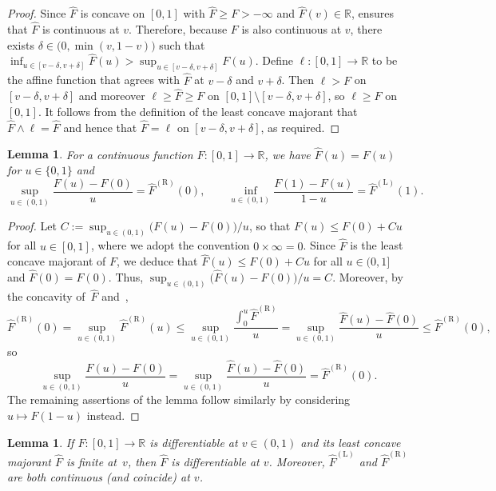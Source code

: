 \documentclass[a4paper]{article}
\newcommand{\R}{\mathbb{R}}
\newtheorem{lemma}[theorem]{Lemma}
\theoremstyle{definition}
\begin{document}
\begin{proof}
Since $\hat{F}$ is concave on $[0,1]$ with $\hat{F} \geq F > -\infty$ and $\hat{F}(v) \in \R$, \citet[Theorem~10.1]{rockafellar97convex} ensures that $\hat{F}$ is continuous at $v$. Therefore, because $F$ is also continuous at $v$, there exists $\delta \in \bigl(0,\min(v, 1 - v)\bigr)$ such that $\inf_{u \in [v - \delta, v + \delta]} \hat{F}(u) > \sup_{u \in [v - \delta, v + \delta]} F(u)$. Define $\ell \colon [0,1] \rightarrow \R$ to be the affine function that agrees with $\hat{F}$ at $v - \delta$ and $v + \delta$.  Then $\ell > F$ on $[v - \delta, v + \delta]$ and moreover $\ell \geq \hat{F} \geq F$ on $[0,1] \setminus [v - \delta, v + \delta]$, so $\ell \geq F$ on $[0,1]$. It follows from the definition of the least concave majorant that $\hat{F} \wedge \ell = \hat{F}$ and hence that $\hat{F} = \ell$ on $[v - \delta, v + \delta]$, as required.
\end{proof}

\begin{lemma}
\label{lem:lcm-deriv-0}
For a continuous function $F \colon [0,1] \to \R$, we have $\hat{F}(u) = F(u)$ for $u \in \{0,1\}$ and
\[
\sup_{u \in (0,1)}\frac{F(u) - F(0)}{u} = \hat{F}^{(\mathrm{R})}(0), \qquad \inf_{u \in (0,1)}\frac{F(1) - F(u)}{1 - u} = \hat{F}^{(\mathrm{L})}(1).
\]
\end{lemma}

\begin{proof}
Let $C := \sup_{u \in (0,1)}\bigl(F(u) - F(0)\bigr)/u$, so that $F(u) \leq F(0) + Cu$ for all $u \in [0,1]$, where we adopt the convention $0 \times \infty = 0$. Since $\hat{F}$ is the least concave majorant of $F$, we deduce that $\hat{F}(u) \leq F(0) + Cu$ for all $u \in (0,1]$ and $\hat{F}(0) = F(0)$. Thus, $\sup_{u \in (0,1)}\bigl(\hat{F}(u) - \hat{F}(0)\bigr)/u = C$. Moreover, by the concavity of~$\hat{F}$ and~\citet[Corollary~24.2.1]{rockafellar97convex},
\[
\hat{F}^{(\mathrm{R})}(0) = \sup_{u \in (0,1)} \hat{F}^{(\mathrm{R})}(u) \leq \sup_{u \in (0,1)}\frac{\int_0^u \hat{F}^{(\mathrm{R})}}{u} = \sup_{u \in (0,1)}\frac{\hat{F}(u) - \hat{F}(0)}{u} \leq \hat{F}^{(\mathrm{R})}(0),
\]
so
\[
\sup_{u \in (0,1)} \frac{F(u) - F(0)}{u} = \sup_{u \in (0,1)} \frac{\hat{F}(u) - \hat{F}(0)}{u} = \hat{F}^{(\mathrm{R})}(0).
\]
The remaining assertions of the lemma follow similarly by considering $u \mapsto F(1 - u)$ instead.
\end{proof}

\begin{lemma}
\label{lem:lcm-deriv}
If $F \colon [0,1] \to \R$ is differentiable at $v \in (0,1)$ and its least concave majorant $\hat{F}$ is finite at~$v$, then $\hat{F}$ is differentiable at $v$. Moreover, $\hat{F}^{(\mathrm{L})}$ and $\hat{F}^{(\mathrm{R})}$ are both continuous (and coincide) at $v$.
\end{lemma}
\end{document}
